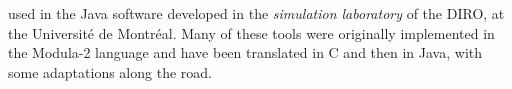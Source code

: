 used in the Java software developed in the {\em simulation laboratory\/}
of the DIRO, at the Universit\'e de Montr\'eal.
Many of these tools were originally implemented in the Modula-2 language
and have been translated in C and then in Java, with some adaptations
along the road.